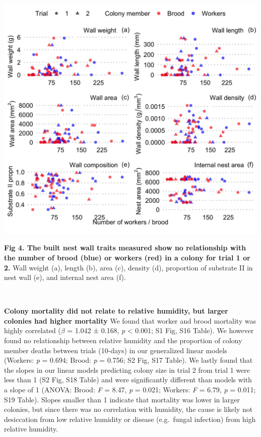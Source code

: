 \documentclass[3p]{elsarticle} %
\begin{document}
\begin{flushleft}\includegraphics[width=1\linewidth,height=0.75\textheight]{../figures/Fig4} \end{flushleft}

\textbf{Fig 4. The built nest wall traits measured show no relationship
with the number of brood (blue) or workers (red) in a colony for trial 1
or 2.} Wall weight (a), length (b), area (c), density (d), proportion of
substrate II in nest wall (e), and internal nest area (f).

~

\textbf{Colony mortality did not relate to relative humidity, but larger
colonies had higher mortality} We found that worker and brood mortality
was highly correlated (\(\beta\) = 1.042 ± 0.168, \emph{p} \textless{}
0.001; S1 Fig, S16 Table). We however found no relationship between
relative humidity and the proportion of colony member deaths between
trials (10-days) in our generalized linear models (Workers: \emph{p} =
0.694; Brood: \emph{p} = 0.756; S2 Fig, S17 Table). We lastly found that
the slopes in our linear models predicting colony size in trial 2 from
trial 1 were less than 1 (S2 Fig, S18 Table) and were significantly
different than models with a slope of 1 (ANOVA: Brood: \emph{F} = 8.47,
\emph{p} = 0.021; Workers: \emph{F} = 6.79, \emph{p} = 0.011; S19
Table). Slopes smaller than 1 indicate that mortality was lower in
larger colonies, but since there was no correlation with humidity, the
cause is likely not desiccation from low relative humidity or disease
(e.g.~fungal infection) from high relative humidity.
\end{document}
